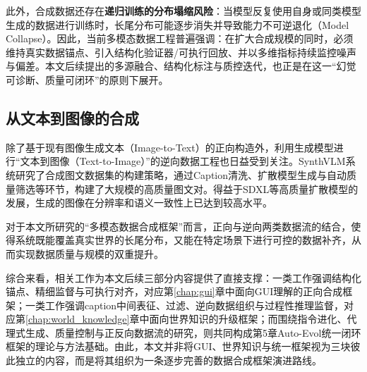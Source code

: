 此外，合成数据还存在\textbf{递归训练的分布塌缩风险}：当模型反复使用自身或同类模型生成的数据进行训练时，长尾分布可能逐步消失并导致能力不可逆退化（Model Collapse）\citep{shumailov2023curse}。因此，当前多模态数据工程普遍强调：在扩大合成规模的同时，必须维持真实数据锚点、引入结构化验证器/可执行回放、并以多维指标持续监控噪声与偏差。本文后续提出的多源融合、结构化标注与质控迭代，也正是在这一“幻觉可诊断、质量可闭环”的原则下展开。

\subsection{从文本到图像的合成}
除了基于现有图像生成文本（Image-to-Text）的正向构造外，利用生成模型进行“文本到图像（Text-to-Image）”的逆向数据工程也日益受到关注。SynthVLM系统研究了合成图文数据集的构建策略，通过Caption清洗、扩散模型生成与自动质量筛选等环节，构建了大规模的高质量图文对\citep{liu2025synthvlm}。得益于SDXL等高质量扩散模型的发展，生成的图像在分辨率和语义一致性上已达到较高水平\citep{podell2023sdxl}。

对于本文所研究的“多模态数据合成框架”而言，正向与逆向两类数据流的结合，使得系统既能覆盖真实世界的长尾分布，又能在特定场景下进行可控的数据补齐，从而实现数据质量与规模的双重提升。

综合来看，相关工作为本文后续三部分内容提供了直接支撑：一类工作强调结构化锚点、精细监督与可执行对齐，对应第\ref{chap:gui}章中面向GUI理解的正向合成框架；一类工作强调caption中间表征、过滤、逆向数据组织与过程性推理监督，对应第\ref{chap:world_knowledge}章中面向世界知识的升级框架；而围绕指令进化、代理式生成、质量控制与正反向数据流的研究，则共同构成第5章Auto-Evol统一闭环框架的理论与方法基础。由此，本文并非将GUI、世界知识与统一框架视为三块彼此独立的内容，而是将其组织为一条逐步完善的数据合成框架演进路线。
